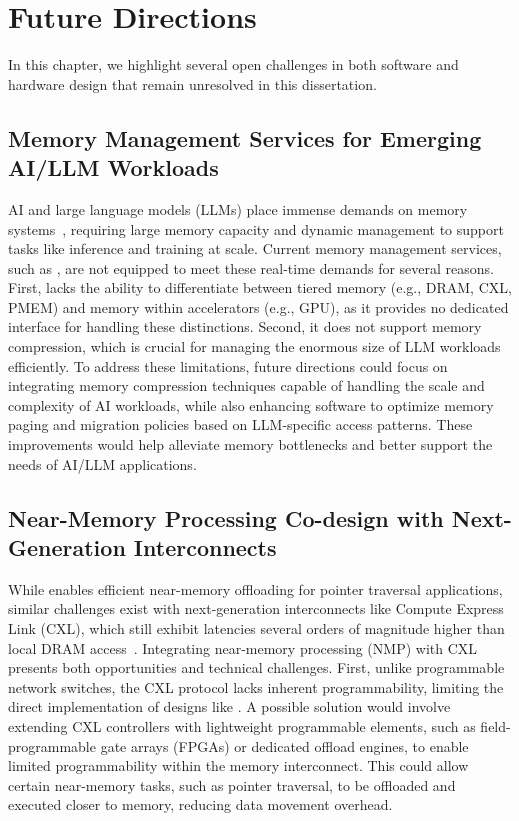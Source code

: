 \chapter{Future Directions}
\label{chap:future}

In this chapter, we highlight several open challenges in both software and hardware design that remain unresolved in this dissertation. 



\section{Memory Management Services for Emerging AI/LLM Workloads}
\label{sec:cxlkv}

AI and large language models (LLMs) place immense demands on memory systems~\cite{pagedattenion, liu2023cachegen}, requiring large memory capacity and dynamic management to support tasks like inference and training at scale. Current memory management services, such as \jiffy, are not equipped to meet these real-time demands for several reasons. First, \jiffy lacks the ability to differentiate between tiered memory (e.g., DRAM, CXL, PMEM) and memory within accelerators (e.g., GPU), as it provides no dedicated interface for handling these distinctions. Second, it does not support memory compression, which is crucial for managing the enormous size of LLM workloads efficiently. To address these limitations, future directions could focus on integrating memory compression techniques capable of handling the scale and complexity of AI workloads, while also enhancing software to optimize memory paging and migration policies based on LLM-specific access patterns. These improvements would help alleviate memory bottlenecks and better support the needs of AI/LLM applications.



\section{Near-Memory Processing Co-design with Next-Generation Interconnects}
While \pulse enables efficient near-memory offloading for pointer traversal applications, similar challenges exist with next-generation interconnects like Compute Express Link (CXL), which still exhibit latencies several orders of magnitude higher than local DRAM access~\cite{pond}. Integrating near-memory processing (NMP) with CXL presents both opportunities and technical challenges. First, unlike programmable network switches, the CXL protocol lacks inherent programmability, limiting the direct implementation of designs like \pulse. A possible solution would involve extending CXL controllers with lightweight programmable elements, such as field-programmable gate arrays (FPGAs) or dedicated offload engines, to enable limited programmability within the memory interconnect. This could allow certain near-memory tasks, such as pointer traversal, to be offloaded and executed closer to memory, reducing data movement overhead.

